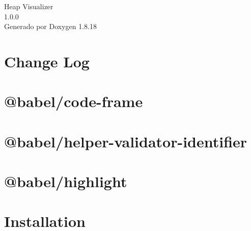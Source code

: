 \let\mypdfximage\pdfximage\def\pdfximage{\immediate\mypdfximage}\documentclass[twoside]{book}
\newcommand{\+}{\discretionary{\mbox{\scriptsize$\hookleftarrow$}}{}{}}
\newcommand{\clearemptydoublepage}{%
  \newpage{\pagestyle{empty}\cleardoublepage}%
}
\begin{document}
\hypersetup{pageanchor=false,
             bookmarksnumbered=true,
             pdfencoding=unicode
            }
\begin{titlepage}
\vspace*{7cm}
\begin{center}%
{\Large Heap Visualizer \\[1ex]\large 1.\+0.\+0 }\\
\vspace*{1cm}
{\large Generado por Doxygen 1.8.18}\\
\end{center}
\end{titlepage}
\clearemptydoublepage
{}
\tableofcontents
\clearemptydoublepage
{}
\hypersetup{pageanchor=true}

\chapter{Change Log}
\label{md_heap-visualizer__c_h_a_n_g_e_l_o_g}

\chapter{@babel/code-\/frame}
\label{md_heap-visualizer_node_modules__0dbabel_code-frame__r_e_a_d_m_e}

\chapter{@babel/helper-\/validator-\/identifier}
\label{md_heap-visualizer_node_modules__0dbabel_helper-validator-identifier__r_e_a_d_m_e}

\chapter{@babel/highlight}
\label{md_heap-visualizer_node_modules__0dbabel_highlight__r_e_a_d_m_e}

\chapter{Installation}
\label{md_heap-visualizer_node_modules__0dtypes_color-name__r_e_a_d_m_e}

\end{document}

